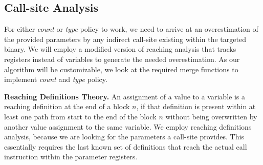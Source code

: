 \subsection{Call-site Analysis}
\label{section:callsiteanalysis}
For either \emph{count} or \emph{type} policy to work, we need to arrive at an overestimation of the provided parameters by any indirect 
call-site existing within the targeted binary. We will employ a modified version of reaching analysis that tracks registers instead of 
variables to generate the needed overestimation. As our algorithm will be customizable, we look at the required merge functions to 
implement \emph{count} and \emph{type} policy. 

\textbf{Reaching Definitions Theory.}
\label{subsection:reachindefinitionstheory}
An assignment of a value to a variable is a reaching definition at the end of a block $n$, if that definition is present within at 
least one path from start to the end of the block $n$ without being overwritten by another value assignment to the same variable. 
We employ reaching definitions analysis, because we are looking for the parameters a call-site provides. This essentially 
requires the last known set of definitions that reach the actual call instruction within the parameter registers.


